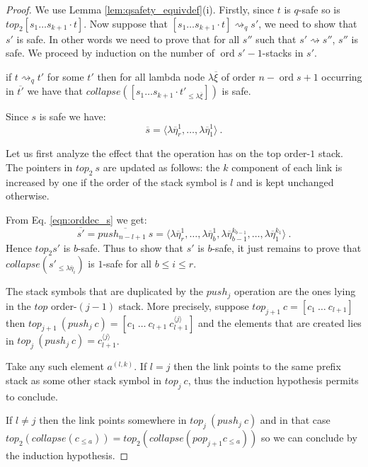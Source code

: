 \documentclass{article}
\newcommand{\ord}{\mathop{\mathrm{ord}}}
\newcommand{\prefixof}{\leqslant}
\theoremstyle{remark}
\theoremstyle{definition}
\newcommand\orddec\overline
\newcommand\saferel\rightsquigarrow
\begin{document}
\begin{proof}
We use Lemma \ref{lem:qsafety_equivdef}(i). Firstly, since $t$ is
$q$-safe so is $top_2 [s_1 \ldots s_{k+1} \cdot t]$. Now suppose
that $[s_1 \ldots s_{k+1} \cdot t] \saferel_q s'$, we need to show
that $s'$ is safe. In other words we need to prove that for all
$s''$ such that $s' \saferel s''$, $s''$ is safe. We proceed by
induction on the number of $\ord{s'}-1$-stacks in $s'$.

\hrulefill

 if $t\saferel_q t'$ for some $t'$ then for all lambda node
$\lambda \overline{\xi}$ of order $n-\ord{s}+1$ occurring in
$\orddec{t'}$ we have that $collapse([s_1 \ldots s_{k+1} \cdot
t'_{\prefixof{\lambda \overline{\xi}}}])$ is safe.


\hrulefill

Since $s$ is safe we have:
\begin{equation}
 \orddec{s} = \langle \lambda \overline{\eta}_r^1
, \ldots, \lambda \overline{\eta}_1^1   \rangle \ . \label{eqn:orddec_s}
\end{equation}

Let us first analyze the effect that the operation has on the top
order-$1$ stack. The pointers in $top_2\ s$ are updated as follows:
the $k$ component of each link is increased by one if the order of
the stack symbol is $l$ and is kept unchanged otherwise.

From Eq. \ref{eqn:orddec_s} we get:
\begin{equation}
\orddec{s'} = \orddec{push_{n-l+1}\ s} = \langle
\lambda \overline{\eta}_r^1
, \ldots,  \lambda \overline{\eta}_{b}^1, \lambda \overline{\eta}_{b-1}^{k_{b-1}}, \ldots,
 \lambda \overline{\eta}_1^{k_{1}} \rangle
\ . \label{eqn:orddec_pushj_s}
\end{equation}
Hence $top_2 s'$ is $b$-safe. Thus to show that $s'$ is $b$-safe, it
just remains to prove that $collapse(s'_{\prefixof \lambda
\overline{\eta}_{i}})$ is $1$-safe for all $b \leq i \leq r$.

\hrulefill

The stack symbols that are duplicated by the $push_j$ operation are
the ones lying in the $top$ order-$(j-1)$ stack. More precisely,
suppose $top_{j+1}\ c = [c_1\ \ldots\ c_{l+1}]$ then $top_{j+1}\
(push_j\ c) = [c_1\ \ldots\ c_{l+1}\ c_{l+1}^{\langle j \rangle}]$
and the elements that are created lies in $top_j\ (push_j\ c) =
c_{l+1}^{\langle j \rangle}$.

Take any such element $a^{(l,k)}$. If $l=j$ then the link points to
the same prefix stack as some other stack symbol in $top_j\ c$, thus
the induction hypothesis permits to conclude.

If $l \neq j$ then the link points somewhere in $top_j\ (push_j\ c)$
and in that case $top_2( collapse(c_{\prefixof{a}})) = top_2(
collapse( pop_{j+1} c_{\prefixof{a}}))$ so we can conclude by the
induction hypothesis.


\hrulefill

\end{proof}
\end{document}
